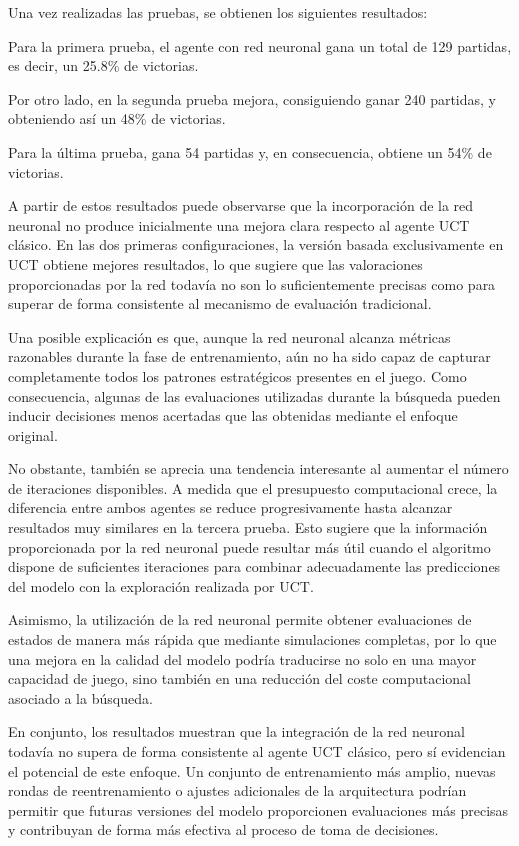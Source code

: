 \documentclass[conference,a4paper]{IEEEtran}
\begin{document}
Una vez realizadas las pruebas, se obtienen los siguientes resultados: 

Para la primera prueba, el agente con red neuronal gana un total de 129 partidas, es decir, un 25.8\% de victorias. 

Por otro lado, en la segunda prueba mejora, consiguiendo ganar 240 partidas, y obteniendo así un 48\% de victorias. 

Para la última prueba, gana 54 partidas y, en consecuencia, obtiene un 54\% de victorias. 

A partir de estos resultados puede observarse que la incorporación de la red neuronal no produce inicialmente una mejora clara respecto al agente UCT clásico. 
En las dos primeras configuraciones, la versión basada exclusivamente en UCT obtiene mejores resultados, lo que sugiere que las valoraciones proporcionadas por la red todavía no son lo suficientemente precisas como para superar de forma consistente al mecanismo de evaluación tradicional. 

Una posible explicación es que, aunque la red neuronal alcanza métricas razonables durante la fase de entrenamiento, aún no ha sido capaz de capturar completamente todos los patrones estratégicos presentes en el juego. 
Como consecuencia, algunas de las evaluaciones utilizadas durante la búsqueda pueden inducir decisiones menos acertadas que las obtenidas mediante el enfoque original. 

No obstante, también se aprecia una tendencia interesante al aumentar el número de iteraciones disponibles. 
A medida que el presupuesto computacional crece, la diferencia entre ambos agentes se reduce progresivamente hasta alcanzar resultados muy similares en la tercera prueba. 
Esto sugiere que la información proporcionada por la red neuronal puede resultar más útil cuando el algoritmo dispone de suficientes iteraciones para combinar adecuadamente las predicciones del modelo con la exploración realizada por UCT. 

Asimismo, la utilización de la red neuronal permite obtener evaluaciones de estados de manera más rápida que mediante simulaciones completas, por lo que una mejora en la calidad del modelo podría traducirse no solo en una mayor capacidad de juego, sino también en una reducción del coste computacional asociado a la búsqueda. 

En conjunto, los resultados muestran que la integración de la red neuronal todavía no supera de forma consistente al agente UCT clásico, pero sí evidencian el potencial de este enfoque. 
Un conjunto de entrenamiento más amplio, nuevas rondas de reentrenamiento o ajustes adicionales de la arquitectura podrían permitir que futuras versiones del modelo proporcionen evaluaciones más precisas y contribuyan de forma más efectiva al proceso de toma de decisiones. 
\end{document}
